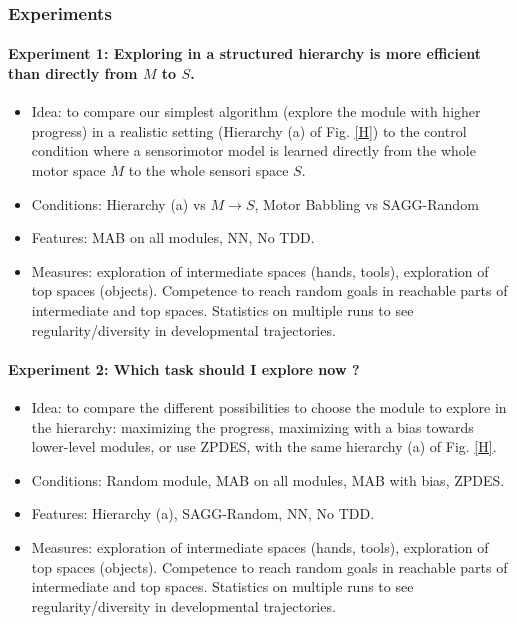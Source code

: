 \documentclass[12pt]{article}
\begin{document}
		
		

		\subsubsection{Experiments}

				\paragraph{Experiment 1: Exploring in a structured hierarchy is more efficient than directly from $M$ to $S$.}				
				\begin{itemize}
					\item Idea: to compare our simplest algorithm (explore the module with higher progress) in a realistic setting (Hierarchy (a) of Fig. \ref{H}) to the control condition where a sensorimotor model is learned
							directly from the whole motor space $M$ to the whole sensori space $S$.
					
					\item Conditions: Hierarchy (a) vs $M \rightarrow S$, Motor Babbling vs SAGG-Random
					
					\item Features: MAB on all modules, NN, No TDD.
					
					\item Measures: exploration of intermediate spaces (hands, tools), exploration of top spaces (objects). Competence to reach random goals in reachable parts of intermediate and top spaces. 
							Statistics on multiple runs to see regularity/diversity in developmental trajectories.
				\end{itemize}
				
				\paragraph{Experiment 2: Which task should I explore now ?}
				\begin{itemize}
					\item Idea: to compare the different possibilities to choose the module to explore in the hierarchy: maximizing the progress, maximizing with a bias towards lower-level modules, or use ZPDES,
							with the same hierarchy (a) of Fig. \ref{H}.
					
					\item Conditions: Random module, MAB on all modules, MAB with bias, ZPDES.
					
					\item Features: Hierarchy (a), SAGG-Random, NN, No TDD.
					
					\item Measures: exploration of intermediate spaces (hands, tools), exploration of top spaces (objects). Competence to reach random goals in reachable parts of intermediate and top spaces. 
							Statistics on multiple runs to see regularity/diversity in developmental trajectories.
				\end{itemize}
				
\end{document}
